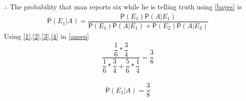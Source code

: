 \documentclass[journal,12pt,twocolumn]{IEEEtran}
\newcommand*{\prob}{\mathsf{P}}
\begin{document}
$\therefore$ The probability that man reports six while he is telling truth using \eqref{bayes} is 
\begin{align}\label{anseq}
\prob(E_{1}|A)=\dfrac{\prob(E_{1}) \prob(A|E_{1})}{\prob(E_{1}) \prob(A|E_{1})+\prob(E_{2}) \prob(A|E_{2})}
\end{align}
 Using \eqref{1},\eqref{2},\eqref{3},\eqref{4} in \eqref{anseq} 
 \begin{align}\label{ans}
 \dfrac{\dfrac{1}{6}*\dfrac{3}{4}}{\dfrac{1}{6}*\dfrac{3}{4}+\dfrac{5}{6}*\dfrac{1}{4}}=\dfrac{3}{8}
 \end{align}
 
  \begin{align}
  \prob(E_{1}|A)=\dfrac{3}{8}
  \end {align}

 
 
\end{document}
